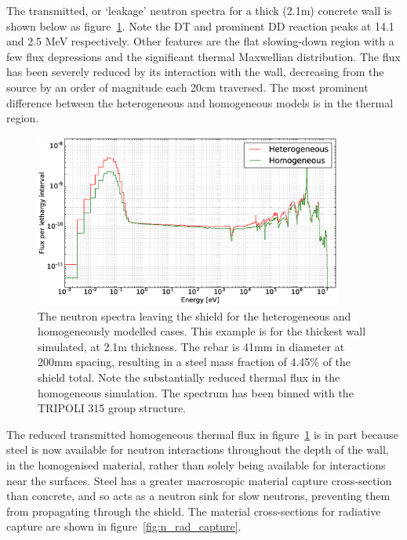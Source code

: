 The transmitted, or `leakage' neutron spectra for a thick (2.1m) concrete wall is shown below as figure~\ref{fig:trans_neutron_spec}. Note the DT and prominent DD reaction peaks at 14.1 and 2.5 MeV respectively. Other features are the flat slowing-down region with a few flux depressions and the significant thermal Maxwellian distribution. The flux has been severely reduced by its interaction with the wall, decreasing from the source by an order of magnitude each 20cm traversed. The most prominent difference between the heterogeneous and homogeneous models is in the thermal region. 

\begin{figure}[H]
  \centering
  \includegraphics[width=0.9\textwidth]{transmitted_neutron_spectra}
  \caption[Comparison of spectra in heterogeneous and homogeneous approaches.]{The neutron spectra leaving the shield for the heterogeneous and homogeneously modelled cases. This example is for the thickest wall simulated, at 2.1m thickness. The rebar is 41mm in diameter at 200mm spacing, resulting in a steel mass fraction of 4.45\% of the shield total. Note the substantially reduced thermal flux in the homogeneous simulation. The spectrum has been binned with the TRIPOLI 315 group structure.}
  \label{fig:trans_neutron_spec}
\end{figure}

The reduced transmitted homogeneous thermal flux in figure~\ref{fig:trans_neutron_spec} is in part because steel is now available for neutron interactions throughout the depth of the wall, in the homogenised material, rather than solely being available for interactions near the surfaces. Steel has a greater macroscopic material capture cross-section than concrete, and so acts as a neutron sink for slow neutrons, preventing them from propagating through the shield. The material cross-sections for radiative capture are shown in figure~\ref{fig:n_rad_capture}.

